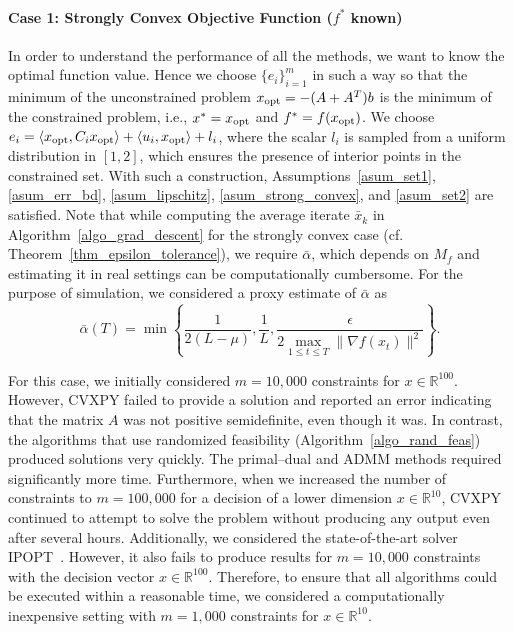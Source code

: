 \documentclass{article}
\def\la{\langle}
\def\ra{\rangle}
\theoremstyle{plain}
\theoremstyle{definition}
\theoremstyle{remark}
\begin{document}
\paragraph{Case 1: Strongly Convex Objective Function ($f^*$ known)} 

In order to understand the performance of all the methods, we want to know the optimal function value. Hence we choose $\{e_i\}_{i=1}^m$ in such a way so that the minimum of the unconstrained problem $x_{\rm opt} = - (A+A^T) b$ is the minimum of the constrained problem, i.e., $x^* = x_{\rm opt}$ and $f^* = f(x_{\rm opt})$. We choose $e_i = \la x_{\rm opt}, C_i x_{\rm opt} \ra + \la u_i, x_{\rm opt} \ra + l_i$, where the scalar $l_i$ is sampled from a uniform distribution in $[1,2]$, which ensures the presence of interior points in the constrained set. With such a construction, Assumptions~\ref{asum_set1}, \ref{asum_err_bd}, \ref{asum_lipschitz}, \ref{asum_strong_convex}, and \ref{asum_set2} are satisfied. Note that while computing the average iterate $\bar x_k$ in Algorithm~\ref{algo_grad_descent} for the strongly convex case (cf. Theorem~\ref{thm_epsilon_tolerance}), we require $\bar \alpha$, which depends on $M_f$ and estimating it in real settings can be computationally cumbersome. For the purpose of simulation, we considered a proxy estimate of $\bar \alpha$ as
\[
\bar{\alpha}(T) = \min\!\left\{ \frac{1}{2(L-\mu)}, \frac{1}{L}, \frac{\epsilon}{2 \max_{1 \le t \le T} \|\nabla f(x_t)\|^2} \right\}.
\]

For this case, we initially considered $m = 10{,}000$ constraints for $x \in \mathbb{R}^{100}$. However, CVXPY failed to provide a solution and reported an error indicating that the matrix $A$ was not positive semidefinite, even though it was. In contrast, the algorithms that use randomized feasibility (Algorithm~\ref{algo_rand_feas}) produced solutions very quickly. The primal--dual and ADMM methods required significantly more time. Furthermore, when we increased the number of constraints to $m = 100{,}000$ for a decision of a lower dimension $x \in \mathbb{R}^{10}$, CVXPY continued to attempt to solve the problem without producing any output even after several hours. Additionally, we considered the state-of-the-art solver IPOPT~\cite{wachter2006implementation}. However, it also fails to produce results for $m = 10{,}000$ constraints with the decision vector $x \in \mathbb{R}^{100}$. Therefore, to ensure that all algorithms could be executed within a reasonable time, we considered a computationally inexpensive setting with $m = 1,000$ constraints for $x \in \mathbb{R}^{10}$.
\end{document}
